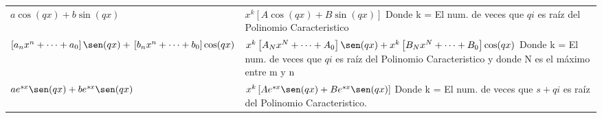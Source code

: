 \documentclass[12pt]{report}                               %
\begin{document}
\begin{longtable}{p{70mm} || p{90mm}}

            $a \cos(qx) + b \sin(qx)$                                                               &

            $x^k \left[ A \cos(qx) + B \sin(qx) \right]$                                            \newline
            \tiny                                                                                   \newline
            \footnotesize Donde k = El num. de veces que $qi$ es raíz del Polinomio Caracteristico  \\ [6.0ex]
 

            $\left[a_nx^n+\cdots+a_0\right] \sen(qx) +                                              \newline
            \left[b_nx^n+\cdots+b_0\right]  \cos(qx) $                                              &

            $x^k \left[A_Nx^N+\cdots+A_0\right]\sen(qx) +                                           \newline
             x^k \left[B_Nx^N+\cdots+B_0\right]\cos(qx) $                                           \newline
            \tiny                                                                                   \newline
            \footnotesize Donde k = El num. de veces que $qi$ es raíz del
            Polinomio Caracteristico y donde N es el máximo entre m y n                             \\ [6.0ex]
         

            $a e^{sx} \sen(qx) + b e^{sx} \sen(qx)$                                                 &

            $x^k \left[A e^{sx} \sen(qx) + B e^{sx} \sen(qx) \right]$                               \newline
            \tiny                                                                                   \newline
            \footnotesize Donde k = El num. de veces que $s+qi$ es raíz del
            Polinomio Caracteristico.                                                               \\ [6.0ex]


\end{longtable}
\end{document}

